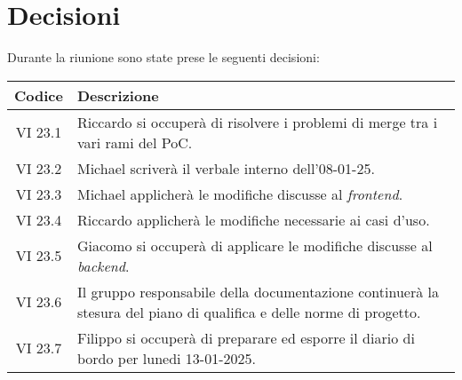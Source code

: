 
\section{Decisioni}

Durante la riunione sono state prese le seguenti decisioni:

\vspace{0.5cm}

\begin{table}[htbp]
    \centering
    \begin{tabular}{|c|p{}|}
        \hline
        \rowcolor[gray]{0.75}
        \textbf{Codice} & \textbf{Descrizione} \\
        \hline
        VI 23.1 & Riccardo si occuperà di risolvere i problemi di merge tra i vari rami del PoC. \\
        \hline
        VI 23.2 & Michael scriverà il verbale interno dell'08-01-25. \\
        \hline
        VI 23.3 & Michael applicherà le modifiche discusse al \emph{frontend}. \\
        \hline
        VI 23.4 & Riccardo applicherà le modifiche necessarie ai casi d'uso. \\
        \hline
        VI 23.5 & Giacomo si occuperà di applicare le modifiche discusse al \emph{backend}. \\
        \hline
        VI 23.6 & Il gruppo responsabile della documentazione continuerà la stesura del piano di qualifica e delle norme di progetto. \\
        \hline
        VI 23.7 & Filippo si occuperà di preparare ed esporre il diario di bordo per lunedi 13-01-2025. \\
        \hline

    \end{tabular}
\end{table}
